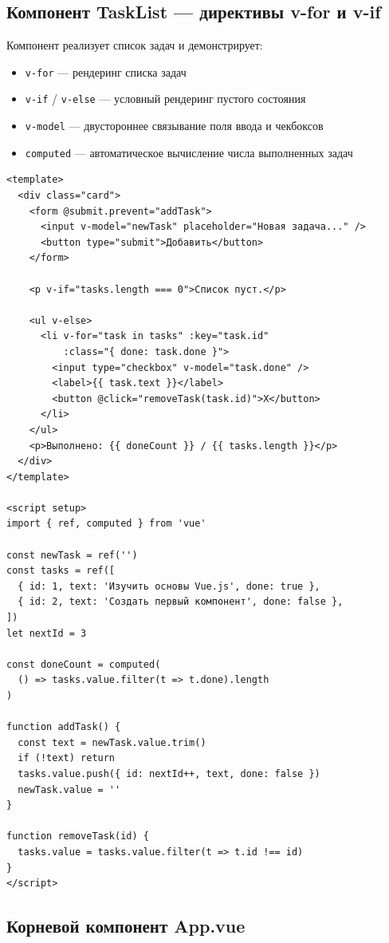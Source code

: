 \documentclass[12pt,a4paper]{article}
\begin{document}
\subsection{Компонент TaskList — директивы v-for и v-if}

Компонент реализует список задач и демонстрирует:
\begin{itemize}
  \item \texttt{v-for} — рендеринг списка задач
  \item \texttt{v-if} / \texttt{v-else} — условный рендеринг пустого состояния
  \item \texttt{v-model} — двустороннее связывание поля ввода и чекбоксов
  \item \texttt{computed} — автоматическое вычисление числа выполненных задач
\end{itemize}

\begin{lstlisting}[language={}]
<template>
  <div class="card">
    <form @submit.prevent="addTask">
      <input v-model="newTask" placeholder="Новая задача..." />
      <button type="submit">Добавить</button>
    </form>

    <p v-if="tasks.length === 0">Список пуст.</p>

    <ul v-else>
      <li v-for="task in tasks" :key="task.id"
          :class="{ done: task.done }">
        <input type="checkbox" v-model="task.done" />
        <label>{{ task.text }}</label>
        <button @click="removeTask(task.id)">X</button>
      </li>
    </ul>
    <p>Выполнено: {{ doneCount }} / {{ tasks.length }}</p>
  </div>
</template>

<script setup>
import { ref, computed } from 'vue'

const newTask = ref('')
const tasks = ref([
  { id: 1, text: 'Изучить основы Vue.js', done: true },
  { id: 2, text: 'Создать первый компонент', done: false },
])
let nextId = 3

const doneCount = computed(
  () => tasks.value.filter(t => t.done).length
)

function addTask() {
  const text = newTask.value.trim()
  if (!text) return
  tasks.value.push({ id: nextId++, text, done: false })
  newTask.value = ''
}

function removeTask(id) {
  tasks.value = tasks.value.filter(t => t.id !== id)
}
</script>
\end{lstlisting}

\subsection{Корневой компонент App.vue}
\end{document}
